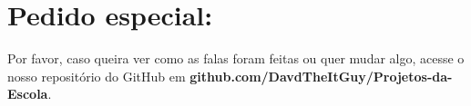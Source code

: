 \section{Pedido especial:}
Por favor, caso queira ver como as falas foram feitas ou quer mudar algo, acesse o nosso repositório do GitHub em \textbf{github.com/DavdTheItGuy/Projetos-da-Escola}.